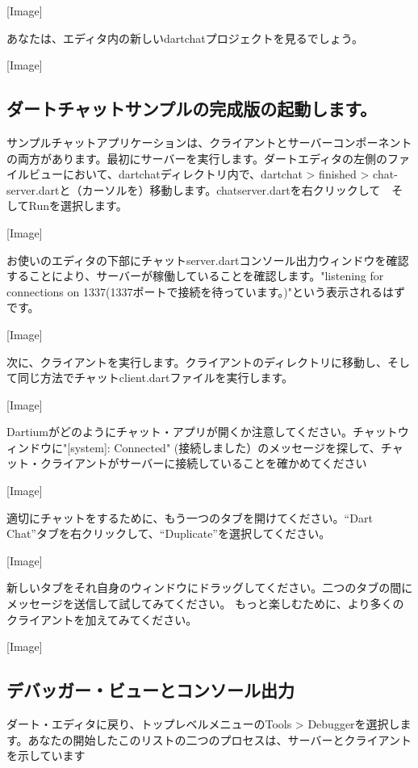 [Image]

あなたは、エディタ内の新しいdartchatプロジェクトを見るでしょう。

[Image]

\subsection{ダートチャットサンプルの完成版の起動します。}

サンプルチャットアプリケーションは、クライアントとサーバーコンポーネントの両方があります。最初にサーバーを実行します。ダートエディタの左側のファイルビューにおいて、dartchatディレクトリ内で、dartchat > finished > chat-server.dartと（カーソルを）移動します。chatserver.dartを右クリックして　そしてRunを選択します。

[Image]

お使いのエディタの下部にチャットserver.dartコンソール出力ウィンドウを確認することにより、サーバーが稼働していることを確認します。"listening for connections on 1337(1337ポートで接続を待っています。)"という表示されるはずです。

[Image]

次に、クライアントを実行します。クライアントのディレクトリに移動し、そして同じ方法でチャットclient.dartファイルを実行します。

[Image]

Dartiumがどのようにチャット・アプリが開くか注意してください。チャットウィンドウに"[system]: Connected" (接続しました）のメッセージを探して、チャット・クライアントがサーバーに接続していることを確かめてください

[Image]

適切にチャットをするために、もう一つのタブを開けてください。“Dart Chat”タブを右クリックして、“Duplicate”を選択してください。

[Image]

新しいタブをそれ自身のウィンドウにドラッグしてください。二つのタブの間にメッセージを送信して試してみてください。
もっと楽しむために、より多くのクライアントを加えてみてください。

[Image]

\subsection{デバッガー・ビューとコンソール出力}

ダート・エディタに戻り、トップレベルメニューのTools > Debuggerを選択します。あなたの開始したこのリストの二つのプロセスは、サーバーとクライアントを示しています

